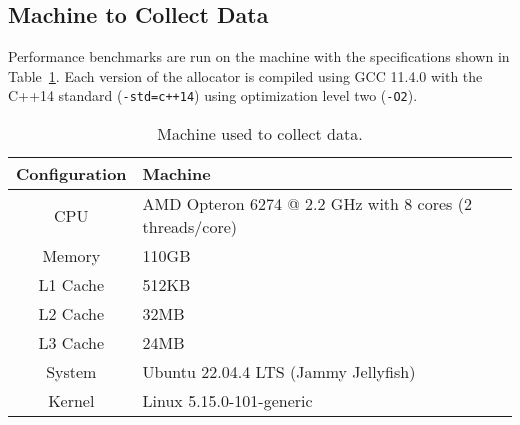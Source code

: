 \subsection{Machine to Collect Data}

Performance benchmarks are run on the machine with the specifications shown in Table~\ref{table:machine}. Each version of the allocator is compiled using GCC 11.4.0 with the C++14 standard (\texttt{-std=c++14}) using optimization level two (\texttt{-O2}).

\begin{table}[H]
    \centering
\begin{tabular}{cp{11.3cm}}
    \textbf{Configuration} & \textbf{Machine} \\ \hline
CPU           & AMD Opteron 6274 @ 2.2 GHz with 8 cores (2 threads/core)\\ \hline
Memory        & 110GB                                                   \\ \hline
L1 Cache      & 512KB                                                   \\ \hline
L2 Cache      & 32MB                                                    \\ \hline
L3 Cache      & 24MB                                                    \\ \hline
System        & Ubuntu 22.04.4 LTS (Jammy Jellyfish)                    \\ \hline
Kernel        & Linux 5.15.0-101-generic
\end{tabular}
\caption{Machine used to collect data.}
\label{table:machine}
\end{table}

